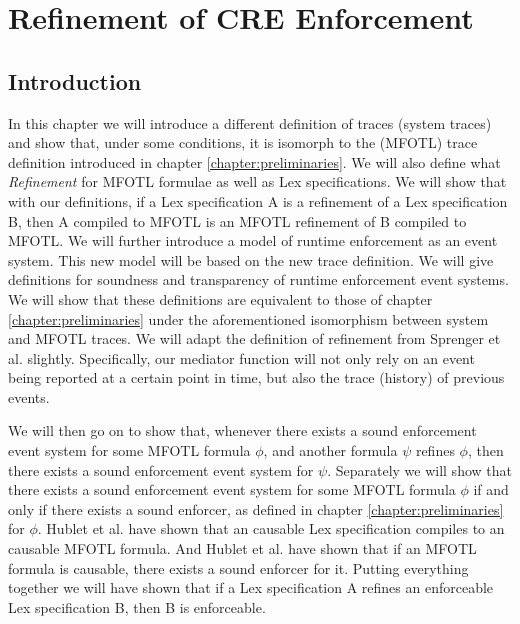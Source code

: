 \chapter{Refinement of CRE Enforcement}
\label{chapter:refinement-of-cre-enforcement}

\section{Introduction}
\label{section:cre-refinement-introduction}
In this chapter we will introduce a different definition of traces (system traces)
and show that, under some conditions, it is isomorph to the (MFOTL) trace
definition introduced in chapter \ref{chapter:preliminaries}.
We will also define what \emph{Refinement} for MFOTL formulae as well as
Lex specifications.
We will show that with our definitions, if a Lex specification A is a refinement
of a Lex specification B, then A compiled to MFOTL is
an MFOTL refinement of B compiled to MFOTL.
We will further introduce a model of runtime enforcement as an event system.
This new model will be based on the new trace definition.
We will give definitions for soundness and transparency of runtime
enforcement event systems.
We will show that these definitions are equivalent to those of
chapter \ref{chapter:preliminaries} under the aforementioned isomorphism
between system and MFOTL traces.
We will adapt the definition of refinement from Sprenger et al. \cite{igloo}
slightly.
Specifically, our mediator function will not only rely on an event being reported
at a certain point in time, but also the trace (history) of previous events.

We will then go on to show that, whenever there exists a sound enforcement
event system for some MFOTL formula $\phi$, and another formula $\psi$ refines
$\phi$, then there exists a sound enforcement event system for $\psi$.
Separately we will show that there exists a sound enforcement event system
for some MFOTL formula $\phi$ if and only if there exists a sound 
enforcer, as defined in chapter \ref{chapter:preliminaries} for $\phi$.
Hublet et al. \cite{lex} have shown that an causable Lex specification
compiles to an causable MFOTL formula.
And Hublet et al. \cite{whyenf} have shown that if an MFOTL formula is 
causable, there exists a sound enforcer for it.
Putting everything together we will have shown that if a Lex specification A
refines an enforceable Lex specification B, then B is enforceable.


